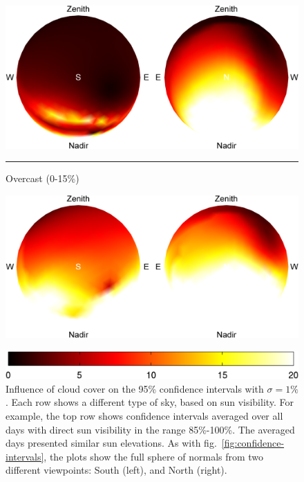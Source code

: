 \begin{figure}[t]
\begin{minipage}{.5\linewidth}
    \includegraphics[width=.9\linewidth]{./figures/confidenceIntervals/mixed-overcast-mean_10pm.png} \\
    \vspace{.4em} \noindent\rule{\linewidth}{0.1pt} \vspace{-.8em}
    \begin{sideways}\begin{minipage}{.4\linewidth}\centering \scriptsize Overcast (0-15\%)\vspace{5pt} \end{minipage}\end{sideways}
    \includegraphics[width=.9\linewidth]{./figures/confidenceIntervals/overcast-mean_10pm.png} \\
    \end{minipage}
    \vspace{3mm}
    \includegraphics[width=.51\linewidth]{./figures/confidenceIntervals/colorbar.png}
    \caption[Influence of cloud cover on confidence intervals]{Influence of cloud cover on the 95\% confidence intervals with $\sigma=1\%$. Each row shows a different type of sky, based on sun visibility. For example, the top row shows confidence intervals averaged over all days with direct sun visibility in the range 85\%-100\%. The averaged days presented similar sun elevations. As with fig.~\ref{fig:confidence-intervals}, the plots show the full sphere of normals from two different viewpoints: South (left), and North (right).}
    \label{fig:cloud-cover}
\end{figure}

